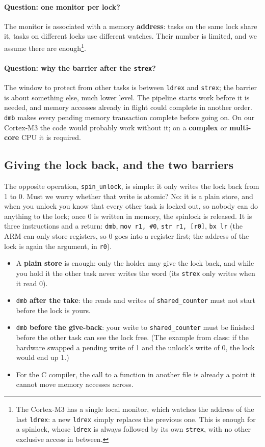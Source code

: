 \paragraph{Question: one monitor per lock?} The monitor is associated with a memory \textbf{address}: tasks on the same lock share it, tasks on different locks use different watches. Their number is limited, and we assume there are enough\footnote{The Cortex-M3 has a single local monitor, which watches the address of the last \texttt{ldrex}: a new \texttt{ldrex} simply replaces the previous one. This is enough for a spinlock, whose \texttt{ldrex} is always followed by its own \texttt{strex}, with no other exclusive access in between.}.

\paragraph{Question: why the barrier after the \texttt{strex}?} The window to protect from other tasks is between \texttt{ldrex} and \texttt{strex}; the barrier is about something else, much lower level. The pipeline starts work before it is needed, and memory accesses already in flight could complete in another order. \texttt{dmb} makes every pending memory transaction complete before going on. On our Cortex-M3 the code would probably work without it; on a \textbf{complex} or \textbf{multi-core} CPU it is required.

\subsection{Giving the lock back, and the two barriers}
The opposite operation, \texttt{spin\_unlock}, is simple: it only writes the lock back from 1 to 0. Must we worry whether that write is atomic? No: it is a plain store, and when you unlock you know that every other task is locked out, so nobody can do anything to the lock; once 0 is written in memory, the spinlock is released. It is three instructions and a return: \texttt{dmb}, \texttt{mov r1, \#0}, \texttt{str r1, [r0]}, \texttt{bx lr} (the ARM can only store registers, so 0 goes into a register first; the address of the lock is again the argument, in \texttt{r0}).
\begin{itemize}
    \item A \textbf{plain store} is enough: only the holder may give the lock back, and while you hold it the other task never writes the word (its \texttt{strex} only writes when it read 0).
    \item \texttt{dmb} \textbf{after the take}: the reads and writes of \texttt{shared\_counter} must not start before the lock is yours.
    \item \texttt{dmb} \textbf{before the give-back}: your write to \texttt{shared\_counter} must be finished before the other task can see the lock free. (The example from class: if the hardware swapped a pending write of 1 and the unlock's write of 0, the lock would end up 1.)
    \item For the C compiler, the call to a function in another file is already a point it cannot move memory accesses across.
\end{itemize}
